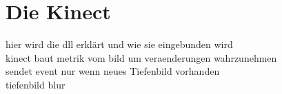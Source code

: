 \section{Die Kinect}
\begin{Spacing}{\mylinespace}



hier wird die dll erklärt und wie sie eingebunden wird\\
kinect baut metrik vom bild um veraenderungen wahrzunehmen\\
sendet event nur wenn neues Tiefenbild vorhanden\\
tiefenbild blur\\

\end{Spacing}
\newpage
\clearpage
